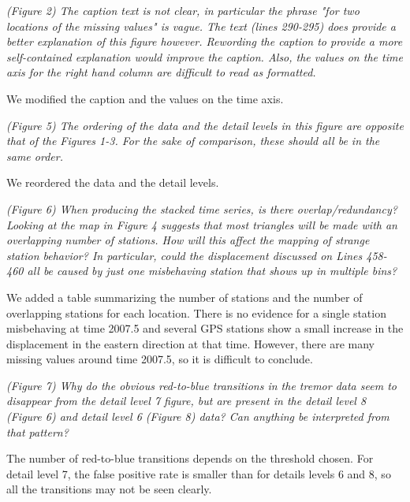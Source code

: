 \documentclass[letterpaper, 12pt]{article}
\begin{document}
\bigskip

\textit{(Figure 2) The caption text is not clear, in particular the phrase "for two locations of the missing values" is vague. The text (lines 290-295) does provide a better explanation of this figure however. Rewording the caption to provide a more self-contained explanation would improve the caption. Also, the values on the time axis for the right hand column are difficult to read as formatted.}

\bigskip

We modified the caption and the values on the time axis.

\bigskip

\textit{(Figure 5) The ordering of the data and the detail levels in this figure are opposite that of the Figures 1-3. For the sake of comparison, these should all be in the same order.}

\bigskip

We reordered the data and the detail levels.

\bigskip

\textit{(Figure 6) When producing the stacked time series, is there overlap/redundancy? Looking at the map in Figure 4 suggests that most triangles will be made with an overlapping number of stations. How will this affect the mapping of strange station behavior? In particular, could the displacement discussed on Lines 458-460 all be caused by just one misbehaving station that shows up in multiple bins?}

\bigskip

We added a table summarizing the number of stations and the number of overlapping stations for each location. There is no evidence for a single station misbehaving at time 2007.5 and several GPS stations show a small increase in the displacement in the eastern direction at that time. However, there are many missing values around time 2007.5, so it is difficult to conclude.

\bigskip

\textit{(Figure 7) Why do the obvious red-to-blue transitions in the tremor data seem to disappear from the detail level 7 figure, but are present in the detail level 8 (Figure 6) and detail level 6 (Figure 8) data? Can anything be interpreted from that pattern?}

\bigskip

The number of red-to-blue transitions depends on the threshold chosen. For detail level 7, the false positive rate is smaller than for details levels 6 and 8, so all the transitions may not be seen clearly.
\end{document}
